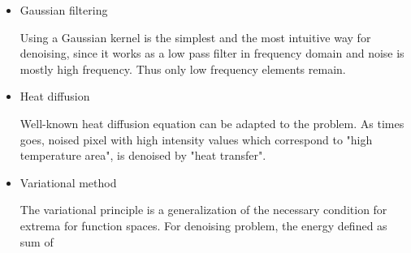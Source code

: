 \documentclass[paper=a4, fontsize=11pt]{scrartcl} %
\numberwithin{equation}{section} %
\numberwithin{figure}{section} %
\numberwithin{table}{section} %
\begin{document}
\begin{itemize}
	\begin{itemize}
		\item Gaussian filtering
		
		Using a Gaussian kernel is the simplest and the most intuitive way for denoising, since it works as a low pass filter in frequency domain and noise is mostly high frequency. Thus only low frequency elements remain.
		 
		\item Heat diffusion 

		Well-known heat diffusion equation can be adapted to the problem. As times goes, noised pixel with high intensity values which correspond to "high temperature area", is denoised by "heat transfer". 
		
		\item Variational method
		
		The variational principle is a generalization of the necessary condition for extrema for function spaces. For denoising problem, the energy defined as sum of  
		
		
	\end{itemize}
\end{itemize}



 

\end{document}
